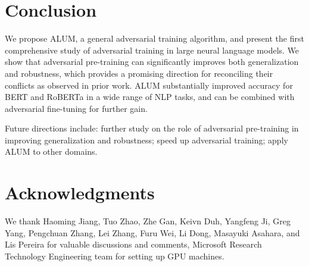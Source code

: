 \documentclass[11pt,a4paper]{article}
\newcommand\DNAME{ALUM}
\newcommand{\eat}[1]{\ignorespaces}
\begin{document}
\section{Conclusion}
\label{sec:conclusion}
We propose {\DNAME}, a general adversarial training algorithm, and present the first comprehensive study of adversarial training in large neural language models. We show that adversarial pre-training can significantly improves both generalization and robustness, which provides a promising direction for reconciling their conflicts as observed in prior work. {\DNAME} substantially improved accuracy for BERT and RoBERTa in a wide range of NLP tasks, and can be combined with adversarial fine-tuning for further gain.

Future directions include: further study on the role of adversarial pre-training in improving generalization and robustness; speed up adversarial training; apply {\DNAME} to other domains.

\eat{
In this study, we explore adversarial training in the realm of large-scale neural language model pre-training and have shown that the proposed {\DNAME} algorithm improves both model generalization and robustness for a wide range of NLP tasks, and  
that combing {\DNAME} with task-specific adversarial fine-tuning creates new SOTAs for a number of NLP tasks, such as SWAG and SNLI.
One drawback of {\DNAME} is its computational cost, which makes pre-training even more time-consuming. In future work, we will explore methods to speed up the adversarial pre-training.
} \section*{Acknowledgments}
We thank Haoming Jiang, Tuo Zhao, Zhe Gan, Keivn Duh, Yangfeng Ji, Greg Yang, Pengchuan Zhang, Lei Zhang, Furu Wei, Li Dong, Masayuki Asahara, and Lis Pereira for valuable discussions and comments, Microsoft Research Technology Engineering team for setting up GPU machines. 
 

\clearpage
\appendix
\end{document}
